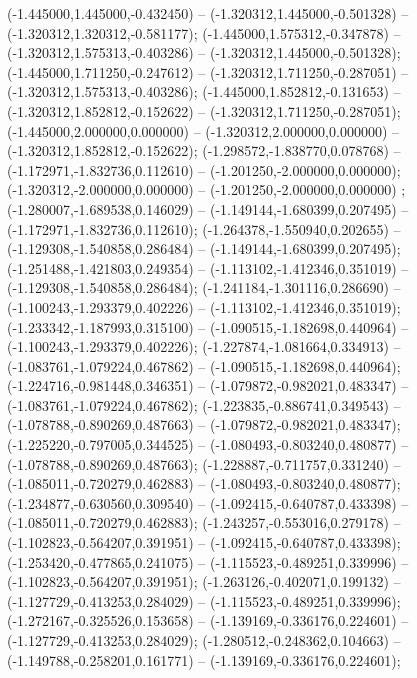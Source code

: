  (-1.445000,1.445000,-0.432450) -- (-1.320312,1.445000,-0.501328) -- (-1.320312,1.320312,-0.581177);
 (-1.445000,1.575312,-0.347878) -- (-1.320312,1.575313,-0.403286) -- (-1.320312,1.445000,-0.501328);
 (-1.445000,1.711250,-0.247612) -- (-1.320312,1.711250,-0.287051) -- (-1.320312,1.575313,-0.403286);
 (-1.445000,1.852812,-0.131653) -- (-1.320312,1.852812,-0.152622) -- (-1.320312,1.711250,-0.287051);
 (-1.445000,2.000000,0.000000) -- (-1.320312,2.000000,0.000000) -- (-1.320312,1.852812,-0.152622);
 (-1.298572,-1.838770,0.078768) -- (-1.172971,-1.832736,0.112610) -- (-1.201250,-2.000000,0.000000);
 (-1.320312,-2.000000,0.000000) -- (-1.201250,-2.000000,0.000000) ;
 (-1.280007,-1.689538,0.146029) -- (-1.149144,-1.680399,0.207495) -- (-1.172971,-1.832736,0.112610);
 (-1.264378,-1.550940,0.202655) -- (-1.129308,-1.540858,0.286484) -- (-1.149144,-1.680399,0.207495);
 (-1.251488,-1.421803,0.249354) -- (-1.113102,-1.412346,0.351019) -- (-1.129308,-1.540858,0.286484);
 (-1.241184,-1.301116,0.286690) -- (-1.100243,-1.293379,0.402226) -- (-1.113102,-1.412346,0.351019);
 (-1.233342,-1.187993,0.315100) -- (-1.090515,-1.182698,0.440964) -- (-1.100243,-1.293379,0.402226);
 (-1.227874,-1.081664,0.334913) -- (-1.083761,-1.079224,0.467862) -- (-1.090515,-1.182698,0.440964);
 (-1.224716,-0.981448,0.346351) -- (-1.079872,-0.982021,0.483347) -- (-1.083761,-1.079224,0.467862);
 (-1.223835,-0.886741,0.349543) -- (-1.078788,-0.890269,0.487663) -- (-1.079872,-0.982021,0.483347);
 (-1.225220,-0.797005,0.344525) -- (-1.080493,-0.803240,0.480877) -- (-1.078788,-0.890269,0.487663);
 (-1.228887,-0.711757,0.331240) -- (-1.085011,-0.720279,0.462883) -- (-1.080493,-0.803240,0.480877);
 (-1.234877,-0.630560,0.309540) -- (-1.092415,-0.640787,0.433398) -- (-1.085011,-0.720279,0.462883);
 (-1.243257,-0.553016,0.279178) -- (-1.102823,-0.564207,0.391951) -- (-1.092415,-0.640787,0.433398);
 (-1.253420,-0.477865,0.241075) -- (-1.115523,-0.489251,0.339996) -- (-1.102823,-0.564207,0.391951);
 (-1.263126,-0.402071,0.199132) -- (-1.127729,-0.413253,0.284029) -- (-1.115523,-0.489251,0.339996);
 (-1.272167,-0.325526,0.153658) -- (-1.139169,-0.336176,0.224601) -- (-1.127729,-0.413253,0.284029);
 (-1.280512,-0.248362,0.104663) -- (-1.149788,-0.258201,0.161771) -- (-1.139169,-0.336176,0.224601);
